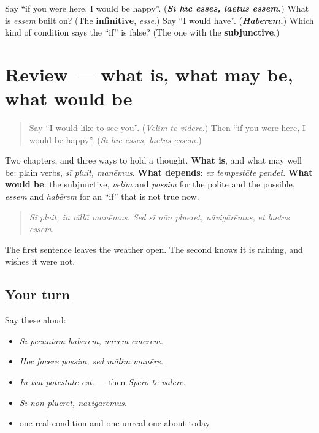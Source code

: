 \begin{tcolorbox}[breakable,colback=teal!4,colframe=teal!35!black,title={Before you move on}]
Say \textquotedblleft{}if you were here, I would be happy\textquotedblright{}. (\emph{\textbf{Sī hīc essēs, laetus essem.}}) What is \emph{essem} built on? (The \textbf{infinitive}, \emph{esse}.) Say \textquotedblleft{}I would have\textquotedblright{}. (\emph{\textbf{Habērem.}}) Which kind of condition says the \textquotedblleft{}if\textquotedblright{} is false? (The one with the \textbf{subjunctive}.)
\end{tcolorbox}
\section[(review)]{Review — what is, what may be, what would be}

\label{lesson:LA-R290-would}



\begin{quote}
Say \textquotedblleft{}I would like to see you\textquotedblright{}. (\emph{Velim tē vidēre.}) Then \textquotedblleft{}if you were here, I would be happy\textquotedblright{}. (\emph{Sī hīc essēs, laetus essem.})
\end{quote}

\begin{grammarlens}[title={What you've built}]
Two chapters, and three ways to hold a thought. \textbf{What is}, and what may well be: plain verbs, \emph{sī pluit, manēmus}. \textbf{What depends}: \emph{ex tempestāte pendet}. \textbf{What would be}: the subjunctive, \emph{velim} and \emph{possim} for the polite and the possible, \emph{essem} and \emph{habērem} for an \textquotedblleft{}if\textquotedblright{} that is not true now.

\begin{quote}
\emph{Sī pluit, in vīllā manēmus. Sed sī nōn plueret, nāvigārēmus, et laetus essem.}
\end{quote}

The first sentence leaves the weather open. The second knows it is raining, and wishes it were not.
\end{grammarlens}

\subsection*{Your turn}
Say these aloud:

\begin{itemize}
\raggedright
  \item \emph{Sī pecūniam habērem, nāvem emerem.}
  \item \emph{Hoc facere possim, sed mālim manēre.}
  \item \emph{In tuā potestāte est.} — then \emph{Spērō tē valēre.}
  \item \emph{Sī nōn plueret, nāvigārēmus.}
  \item one real condition and one unreal one about today
\end{itemize}

